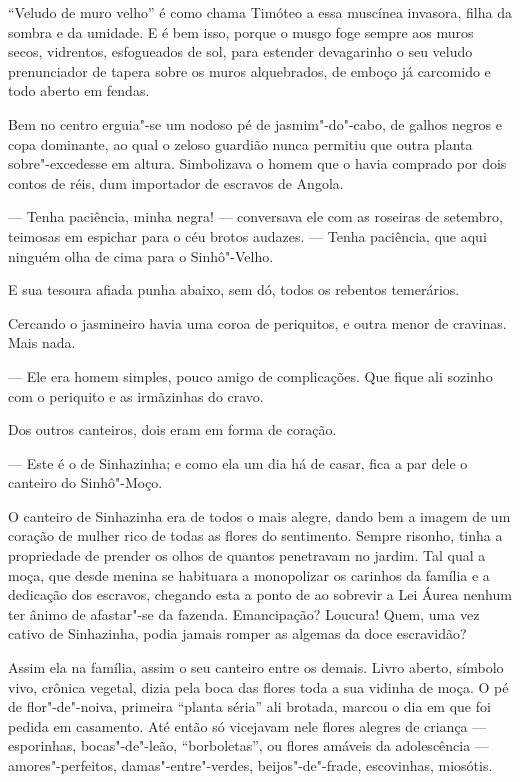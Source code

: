 ``Veludo de muro velho'' é como chama Timóteo a essa muscínea invasora,
filha da sombra e da umidade. E é bem isso, porque o musgo foge sempre
aos muros secos, vidrentos, esfogueados de sol, para estender
devagarinho o seu veludo prenunciador de tapera sobre os muros
alquebrados, de emboço já carcomido e todo aberto em fendas.

Bem no centro erguia"-se um nodoso pé de jasmim"-do"-cabo, de galhos negros
e copa dominante, ao qual o zeloso guardião nunca permitiu que outra
planta sobre"-excedesse em altura. Simbolizava o homem que o havia
comprado por dois contos de réis, dum importador de escravos de Angola.

--- Tenha paciência, minha negra! --- conversava ele com as roseiras de
setembro, teimosas em espichar para o céu brotos audazes. --- Tenha
paciência, que aqui ninguém olha de cima para o Sinhô"-Velho.

E sua tesoura afiada punha abaixo, sem dó, todos os rebentos temerários.

Cercando o jasmineiro havia uma coroa de periquitos, e outra menor de
cravinas. Mais nada.

--- Ele era homem simples, pouco amigo de complicações. Que fique ali
sozinho com o periquito e as irmãzinhas do cravo.

Dos outros canteiros, dois eram em forma de coração.

--- Este é o de Sinhazinha; e como ela um dia há de casar, fica a par
dele o canteiro do Sinhô"-Moço.

O canteiro de Sinhazinha era de todos o mais alegre, dando bem a imagem
de um coração de mulher rico de todas as flores do sentimento. Sempre
risonho, tinha a propriedade de prender os olhos de quantos penetravam
no jardim. Tal qual a moça, que desde menina se habituara a monopolizar
os carinhos da família e a dedicação dos escravos, chegando esta a ponto
de ao sobrevir a Lei Áurea nenhum ter ânimo de afastar"-se da fazenda.
Emancipação? Loucura! Quem, uma vez cativo de Sinhazinha, podia jamais
romper as algemas da doce escravidão?

Assim ela na família, assim o seu canteiro entre os demais. Livro
aberto, símbolo vivo, crônica vegetal, dizia pela boca das flores toda a
sua vidinha de moça. O pé de flor"-de"-noiva, primeira ``planta séria''
ali brotada, marcou o dia em que foi pedida em casamento. Até então só
vicejavam nele flores alegres de criança --- esporinhas, bocas"-de"-leão,
``borboletas'', ou flores amáveis da adolescência --- amores"-perfeitos,
damas"-entre"-verdes, beijos"-de"-frade, escovinhas, miosótis.


